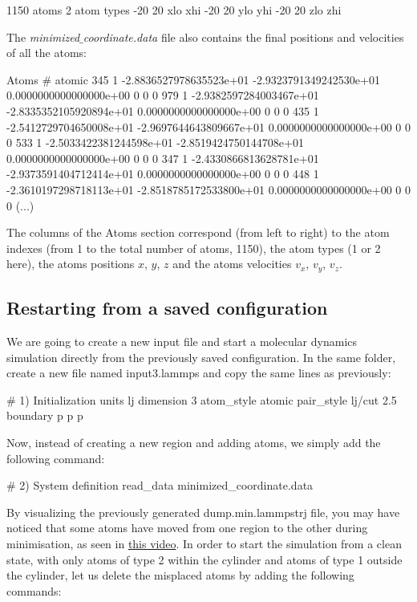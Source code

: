\begin{lcverbatim}
1150 atoms
2 atom types
-20 20 xlo xhi
-20 20 ylo yhi
-20 20 zlo zhi
\end{lcverbatim}

\noindent The \textit{minimized$\_$coordinate.data} file also contains the final
positions and velocities of all the atoms:

\begin{lcverbatim}
Atoms # atomic
345 1 -2.8836527978635523e+01 -2.9323791349242530e+01 0.0000000000000000e+00 0 0 0
979 1 -2.9382597284003467e+01 -2.8335352105920894e+01 0.0000000000000000e+00 0 0 0
435 1 -2.5412729704650008e+01 -2.9697644643809667e+01 0.0000000000000000e+00 0 0 0
533 1 -2.5033422381244598e+01 -2.8519424750144708e+01 0.0000000000000000e+00 0 0 0
347 1 -2.4330866813628781e+01 -2.9373591404712414e+01 0.0000000000000000e+00 0 0 0
448 1 -2.3610197298718113e+01 -2.8518785172533800e+01 0.0000000000000000e+00 0 0 0
(...)
\end{lcverbatim}

\noindent The columns of the Atoms section
correspond (from left to right) to the atom indexes (from 1
to the total number of atoms, 1150), the atom types (1 or 2
here), the atoms positions $x$, $y$, $z$ and the
atoms velocities $v_x$, $v_y$, $v_z$.

\subsection{Restarting from a saved configuration}

\noindent We are going to create a new input file and start a
molecular dynamics simulation directly from the previously
saved configuration. In the same folder, create a new file
named input3.lammps and copy the same lines as previously:

\begin{lcverbatim}
# 1) Initialization
units lj
dimension 3
atom_style atomic
pair_style lj/cut 2.5
boundary p p p
\end{lcverbatim}

\noindent Now, instead of creating a new region and adding atoms, we
simply add the following command:

\begin{lcverbatim}
# 2) System definition
read_data minimized_coordinate.data
\end{lcverbatim}

\noindent By visualizing the previously generated dump.min.lammpstrj
file, you may have noticed that some atoms have moved from
one region to the other during minimisation, as seen in
\href{https://www.youtube.com/embed/gfJ_n33-F6A}{this video}.
In order to start the simulation from a clean state, with
only atoms of type 2 within the cylinder and atoms of type
1 outside the cylinder, let us delete the misplaced atoms
by adding the following commands:

